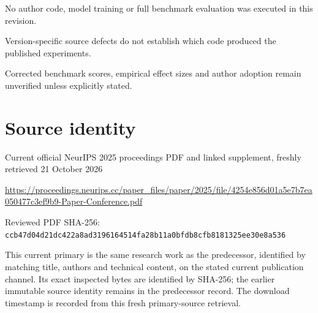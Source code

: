 \documentclass[11pt]{article}
\begin{document}
No author code, model training or full benchmark evaluation was executed in this revision.\par

Version-specific source defects do not establish which code produced the published experiments.\par

Corrected benchmark scores, empirical effect sizes and author adoption remain unverified unless explicitly stated.\par

\section*{Source identity}

Current official NeurIPS 2025 proceedings PDF and linked supplement, freshly retrieved 21 October 2026

\url{https://proceedings.neurips.cc/paper_files/paper/2025/file/4254e856d01a5e7b7ea050477c3ef9b9-Paper-Conference.pdf}

Reviewed PDF SHA-256: \nolinkurl{ccb47d04d21dc422a8ad3196164514fa28b11a0bfdb8cfb8181325ee30e8a536}

This current primary is the same research work as the predecessor, identified by matching title, authors and technical content, on the stated current publication channel. Its exact inspected bytes are identified by SHA-256; the earlier immutable source identity remains in the predecessor record. The download timestamp is recorded from this fresh primary-source retrieval.
\end{document}
